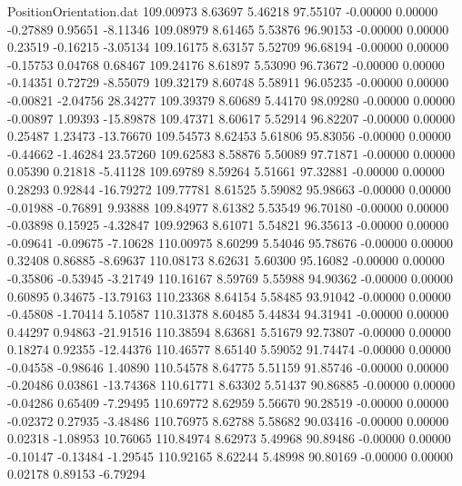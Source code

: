 \begin{filecontents}{PositionOrientation.dat}
 109.00973    8.63697    5.46218    97.55107   -0.00000    0.00000   -0.27889    0.95651   -8.11346
 109.08979    8.61465    5.53876    96.90153   -0.00000    0.00000    0.23519   -0.16215   -3.05134
 109.16175    8.63157    5.52709    96.68194   -0.00000    0.00000   -0.15753    0.04768    0.68467
 109.24176    8.61897    5.53090    96.73672   -0.00000    0.00000   -0.14351    0.72729   -8.55079
 109.32179    8.60748    5.58911    96.05235   -0.00000    0.00000   -0.00821   -2.04756   28.34277
 109.39379    8.60689    5.44170    98.09280   -0.00000    0.00000   -0.00897    1.09393  -15.89878
 109.47371    8.60617    5.52914    96.82207   -0.00000    0.00000    0.25487    1.23473  -13.76670
 109.54573    8.62453    5.61806    95.83056   -0.00000    0.00000   -0.44662   -1.46284   23.57260
 109.62583    8.58876    5.50089    97.71871   -0.00000    0.00000    0.05390    0.21818   -5.41128
 109.69789    8.59264    5.51661    97.32881   -0.00000    0.00000    0.28293    0.92844  -16.79272
 109.77781    8.61525    5.59082    95.98663   -0.00000    0.00000   -0.01988   -0.76891    9.93888
 109.84977    8.61382    5.53549    96.70180   -0.00000    0.00000   -0.03898    0.15925   -4.32847
 109.92963    8.61071    5.54821    96.35613   -0.00000    0.00000   -0.09641   -0.09675   -7.10628
 110.00975    8.60299    5.54046    95.78676   -0.00000    0.00000    0.32408    0.86885   -8.69637
 110.08173    8.62631    5.60300    95.16082   -0.00000    0.00000   -0.35806   -0.53945   -3.21749
 110.16167    8.59769    5.55988    94.90362   -0.00000    0.00000    0.60895    0.34675  -13.79163
 110.23368    8.64154    5.58485    93.91042   -0.00000    0.00000   -0.45808   -1.70414    5.10587
 110.31378    8.60485    5.44834    94.31941   -0.00000    0.00000    0.44297    0.94863  -21.91516
 110.38594    8.63681    5.51679    92.73807   -0.00000    0.00000    0.18274    0.92355  -12.44376
 110.46577    8.65140    5.59052    91.74474   -0.00000    0.00000   -0.04558   -0.98646    1.40890
 110.54578    8.64775    5.51159    91.85746   -0.00000    0.00000   -0.20486    0.03861  -13.74368
 110.61771    8.63302    5.51437    90.86885   -0.00000    0.00000   -0.04286    0.65409   -7.29495
 110.69772    8.62959    5.56670    90.28519   -0.00000    0.00000   -0.02372    0.27935   -3.48486
 110.76975    8.62788    5.58682    90.03416   -0.00000    0.00000    0.02318   -1.08953   10.76065
 110.84974    8.62973    5.49968    90.89486   -0.00000    0.00000   -0.10147   -0.13484   -1.29545
 110.92165    8.62244    5.48998    90.80169   -0.00000    0.00000    0.02178    0.89153   -6.79294

\end{filecontents}
